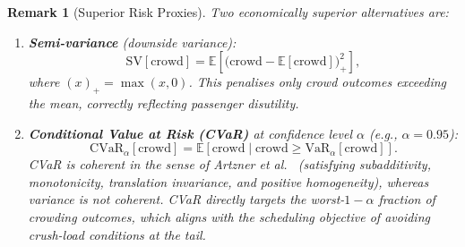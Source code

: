 \documentclass[11pt, a4paper]{article}
\newtheorem{remark}[theorem]{Remark}
\theoremstyle{remark}
\newcommand{\crowd}{\mathrm{crowd}}
\newcommand{\CVaR}{\mathrm{CVaR}}
\newcommand{\E}{\mathbb{E}}
\begin{document}
\begin{remark}[Superior Risk Proxies]
    Two economically superior alternatives are:
    \begin{enumerate}
        \item \textbf{Semi-variance} (downside variance):
              \[
                  \mathrm{SV}[\crowd] = \E\left[\bigl(\crowd - \E[\crowd]\bigr)_+^2\right],
              \]
              where $(x)_+ = \max(x, 0)$. This penalises only crowd outcomes
              exceeding the mean, correctly reflecting passenger disutility.

        \item \textbf{Conditional Value at Risk (CVaR)} at confidence level
              $\alpha$ (e.g., $\alpha = 0.95$):
              \[
                  \CVaR_\alpha[\crowd] = \E\left[\crowd \mid \crowd \ge \mathrm{VaR}_\alpha[\crowd]\right].
              \]
              CVaR is coherent in the sense of Artzner et al.~\cite{artzner1999}
              (satisfying subadditivity, monotonicity, translation invariance,
              and positive homogeneity), whereas variance is not coherent.
              CVaR directly targets the worst-$1{-}\alpha$ fraction of crowding
              outcomes, which aligns with the scheduling objective of avoiding
              crush-load conditions at the tail.
    \end{enumerate}
\end{remark}
\end{document}
